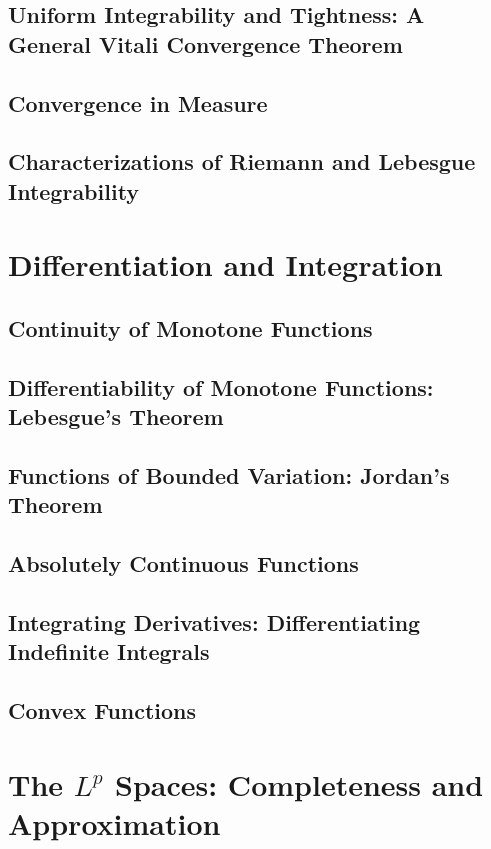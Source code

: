 \documentclass[a4paper,10pt]{book}
\theoremstyle{plain} %
\begin{document}
\section{Uniform Integrability and Tightness: A General Vitali Convergence Theorem}
\section{Convergence in Measure}
\section{Characterizations of Riemann and Lebesgue Integrability}

\chapter{Differentiation and Integration}

\section{Continuity of Monotone Functions}
\section{Differentiability of Monotone Functions: Lebesgue's Theorem}
\section{Functions of Bounded Variation: Jordan's Theorem}
\section{Absolutely Continuous Functions}
\section{Integrating Derivatives: Differentiating Indefinite Integrals}
\section{Convex Functions}

\chapter{The $L^p$ Spaces: Completeness and Approximation}
\end{document}

